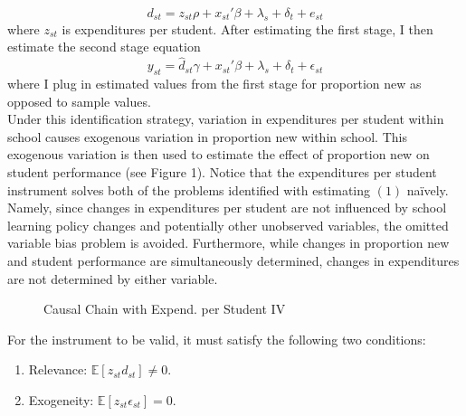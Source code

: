 \documentclass[12pt]{report}
\begin{document}
\begin{equation}
d_{st} = z_{st}\rho + x_{st}'\beta + \lambda_s + \delta_t + e_{st}
\end{equation}
\noindent where $z_{st}$ is expenditures per student. After estimating the first stage, I then estimate the second stage equation
\begin{equation}
y_{st} = \hat{d}_{st}\gamma + x_{st}'\beta + \lambda_s + \delta_t + \epsilon_{st}
\end{equation}
\noindent where I plug in estimated values from the first stage for proportion new as opposed to sample values. \\
\indent Under this identification strategy, variation in expenditures per student within school causes exogenous variation in proportion new within school. This exogenous variation is then used to estimate the effect of proportion new on student performance (see Figure 1). \noindent Notice that the expenditures per student instrument solves both of the problems identified with estimating $(1)$ na\"{i}vely. Namely, since changes in expenditures per student are not influenced by school learning policy changes and potentially other unobserved variables, the omitted variable bias problem is avoided. Furthermore, while changes in proportion new and student performance are simultaneously determined, changes in expenditures are not determined by either variable.
\begin{figure}[h!]
\begin{center}
\end{center}
\caption{Causal Chain with Expend. per Student IV}
\end{figure}

\indent For the instrument to be valid, it must satisfy the following two conditions:

\singlespacing
\begin{enumerate}
    \item Relevance: $\mathbb{E}[z_{st}d_{st}]\not=0$.
    \item Exogeneity: $\mathbb{E}[z_{st}\epsilon_{st}]=0$.
\end{enumerate}
\end{document}
